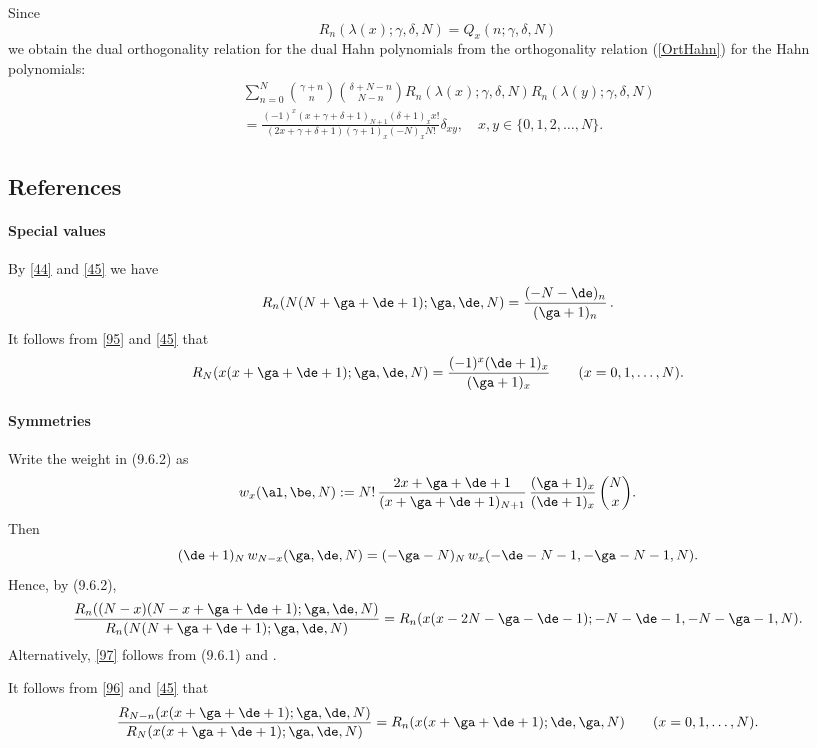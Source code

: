 \documentclass[envcountchap,graybox]{svmono}
\newcounter{rom}
\begin{document}
\noindent
Since
$$R_n(\lambda(x);\gamma,\delta,N)=Q_x(n;\gamma,\delta,N)$$
we obtain the dual orthogonality relation for the dual Hahn polynomials
from the orthogonality relation (\ref{OrtHahn}) for the Hahn polynomials:
\begin{eqnarray*}
& &\sum_{n=0}^N\binom{\gamma+n}{n}\binom{\delta+N-n}{N-n} R_n(\lambda(x);\gamma,\delta,N)R_n(\lambda(y);\gamma,\delta,N)\\
& &{}=\frac{(-1)^x(x+\gamma+\delta+1)_{N+1}(\delta+1)_xx!}
{(2x+\gamma+\delta+1)(\gamma+1)_x(-N)_xN!}\delta_{xy},\quad x,y \in \{0,1,2,\ldots,N\}.
\end{eqnarray*}

\subsection*{References}
\label{sec9.6}
%
\paragraph{Special values}
By \eqref{44} and \eqref{45} we have
\begin{equation}
R_n(N(N+\ga+\de+1);\ga,\de,N)=\frac{(-N-\de)_n}{(\ga+1)_n}\,.
\label{47}
\end{equation}
It follows from \eqref{95} and \eqref{45} that
\begin{equation}
R_N(x(x+\ga+\de+1);\ga,\de,N)
=\frac{(-1)^x(\de+1)_x}{(\ga+1)_x}\qquad(x=0,1,\ldots,N).
\label{101}
\end{equation}
%
\paragraph{Symmetries}
Write the weight in (9.6.2) as
\begin{equation}
w_x(\al,\be,N):=N!\,\frac{2x+\ga+\de+1}{(x+\ga+\de+1)_{N+1}}\,
\frac{(\ga+1)_x}{(\de+1)_x}\,\binom Nx.
\label{98}
\end{equation}
Then
\begin{equation}
(\de+1)_N\,w_{N-x}(\ga,\de,N)=
(-\ga-N)_N\,w_x(-\de-N-1,-\ga-N-1,N).
\label{99}
\end{equation}
Hence, by (9.6.2),
\begin{equation}
\frac{R_n((N-x)(N-x+\ga+\de+1);\ga,\de,N)}{R_n(N(N+\ga+\de+1);\ga,\de,N)}
=R_n(x(x-2N-\ga-\de-1);-N-\de-1,-N-\ga-1,N).
\label{97}
\end{equation}
Alternatively, \eqref{97} follows from (9.6.1) and
.

It follows from \eqref{96} and \eqref{45} that
\begin{equation}
\frac{R_{N-n}(x(x+\ga+\de+1);\ga,\de,N)}
{R_N(x(x+\ga+\de+1);\ga,\de,N)}
=R_n(x(x+\ga+\de+1);\de,\ga,N)\qquad(x=0,1,\ldots,N).
\label{102}
\end{equation}
%
\end{document}
